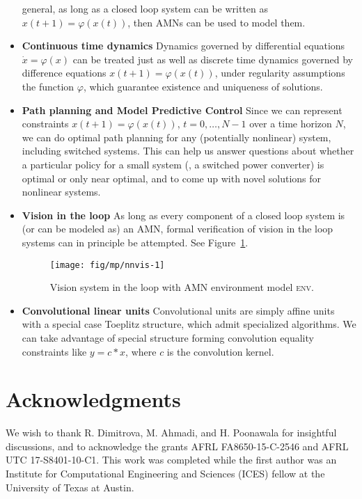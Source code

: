 \documentclass[10pt]{article}
\newcommand{\amn}{\varphi}
\theoremstyle{remark}
\theoremstyle{definition}
\theoremstyle{plain}
\begin{document}
\begin{itemize}
	general, as long as a closed loop system can be written as
	$x(t+1)=\amn(x(t))$, then AMNs can be used to model them. 
	\item \textbf{Continuous time dynamics} Dynamics governed by differential equations
    $\dot{x} = \amn(x)$ can be treated just as well as discrete time dynamics governed 
    by difference equations $x(t+1)=\amn(x(t))$, under regularity assumptions the 
    function $\amn$, which guarantee existence and uniqueness of solutions.
	\item \textbf{Path planning and Model Predictive Control} Since we can represent constraints
	$x(t+1) = \amn(x(t))$, $t=0,\ldots, N-1$  over a time horizon $N$, we can
	do optimal path planning for any (potentially nonlinear) system, including
	switched systems. This can help us answer questions about whether a
	particular policy for a small system (\eg, a switched power converter) is
	optimal or only near optimal, and to come up with novel solutions for
	nonlinear systems. 
	\item \textbf{Vision in the loop}
	As long as every component of a closed loop system is (or can be modeled
	as) an AMN, formal verification of vision in the loop systems can in
	principle be attempted. See Figure~\ref{fig:nnvis1}.
		\begin{figure}[htpb]
			\centering
			\texttt{[image: fig/mp/nnvis-1]}
			\caption{Vision system in the loop with AMN environment model
			\textsc{env}.}
			\label{fig:nnvis1}
		\end{figure}
	\item \textbf{Convolutional linear units} Convolutional units are simply
	affine units with a special case Toeplitz structure, which admit
	specialized algorithms. We can take advantage of special structure forming
	convolution equality constraints like $y = c * x$, where $c$ is the
	convolution kernel.
\end{itemize}

\section{Acknowledgments}
We wish to thank R. Dimitrova, M. Ahmadi, and H. Poonawala for insightful
discussions, and to acknowledge the grants 
AFRL FA8650-15-C-2546 and
AFRL UTC 17-S8401-10-C1.
This work was completed while the first author was an Institute for
Computational Engineering and Sciences (ICES) fellow at the University of Texas
at Austin.
\end{document}
